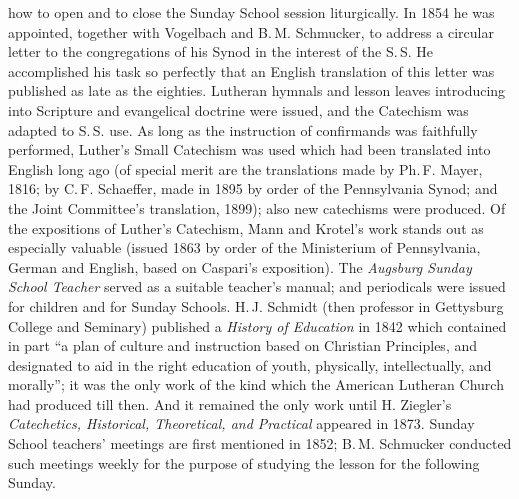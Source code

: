 how to open and to close the Sunday School session liturgically. In 1854 he was appointed, together with Vogelbach and B.\,M. Schmucker, to address a circular letter to the congregations of his Synod in the interest of the S.\,S. He accomplished his task so perfectly that an English translation of this letter was published as late as the eighties. Lutheran hymnals and lesson leaves introducing into Scripture and evangelical doctrine were issued, and the Catechism was adapted to S.\,S. use. As long as the instruction of confirmands was faithfully performed, Luther’s Small Catechism was used which had been translated into English long ago (of special merit are the translations made by Ph.\,F. Mayer, 1816; by C.\,F. Schaeffer, made in 1895 by order of the Pennsylvania Synod; and the Joint Committee’s translation, 1899); also new catechisms were produced. Of the expositions of Luther’s Catechism, Mann and Krotel’s work stands out as especially valuable (issued 1863 by order of the Ministerium of Pennsylvania, German and English, based on Caspari’s exposition). The \emph{Augsburg Sunday School Teacher} served as a suitable teacher’s manual; and periodicals were issued for children and for Sunday Schools. H.\,J. Schmidt (then professor in Gettysburg College and Seminary) published a \emph{History of Education} in 1842 which contained in part “a plan of culture and instruction based on Christian Principles, and designated to aid in the right education of youth, physically, intellectually, and morally”; it was the only work of the kind which the American Lutheran Church had produced till then. And it remained the only work until H. Ziegler’s \emph{Catechetics, Historical, Theoretical, and Practical} appeared in 1873. Sunday School teachers’ meetings are first mentioned in 1852; B.\,M. Schmucker conducted such meetings weekly for the purpose of studying the lesson for the following Sunday.

